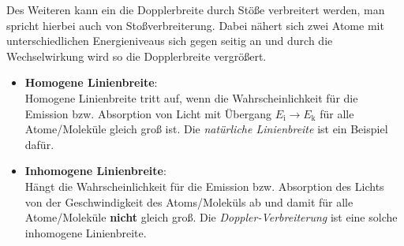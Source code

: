 Des Weiteren kann ein die Dopplerbreite durch Stöße verbreitert werden, man spricht hierbei auch von Stoßverbreiterung. Dabei nähert sich zwei Atome mit unterschiedlichen Energieniveaus sich gegen seitig an und durch die Wechselwirkung wird so die Dopplerbreite vergrößert. \cite{DemtroederAtome}
\begin{itemize}
    \item \textbf{Homogene Linienbreite}:\\
    Homogene Linienbreite tritt auf, wenn die Wahrscheinlichkeit für die Emission bzw. Absorption von Licht mit Übergang $E_\mathrm{i} \rightarrow E_\mathrm{k}$ für alle Atome/Moleküle gleich groß ist. Die \textit{natürliche Linienbreite} ist ein Beispiel dafür. \cite{DemtroederLaser1}
    \item \textbf{Inhomogene Linienbreite}:\\
    Hängt die Wahrscheinlichkeit für die Emission bzw. Absorption des Lichts von der Geschwindigkeit des Atoms/Moleküls ab und damit für alle Atome/Moleküle \textbf{nicht} gleich groß. Die \textit{Doppler-Verbreiterung} ist eine solche inhomogene Linienbreite. \cite{DemtroederLaser1}
\end{itemize}